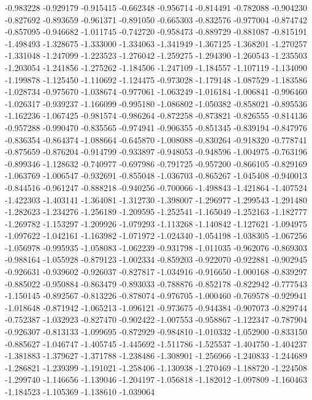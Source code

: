 -0.983228
-0.929179
-0.915415
-0.662348
-0.956714
-0.814491
-0.782088
-0.904230
-0.827692
-0.893659
-0.961371
-0.891050
-0.665303
-0.832576
-0.977004
-0.874742
-0.857095
-0.946682
-1.011745
-0.742720
-0.958473
-0.889729
-0.881087
-0.815191
-1.498493
-1.328675
-1.333000
-1.334063
-1.341949
-1.367125
-1.368201
-1.270257
-1.331048
-1.247099
-1.223523
-1.276042
-1.259275
-1.294390
-1.260543
-1.235503
-1.203054
-1.241856
-1.275262
-1.184506
-1.247109
-1.184557
-1.107119
-1.134090
-1.199878
-1.125450
-1.110692
-1.124475
-0.973028
-1.179148
-1.087529
-1.183586
-1.028734
-0.975670
-1.038674
-0.977061
-1.063249
-1.016184
-1.006841
-0.996460
-1.026317
-0.939237
-1.166099
-0.995180
-1.086802
-1.050382
-0.858021
-0.895536
-1.162236
-1.067425
-0.981574
-0.986264
-0.872258
-0.873821
-0.826555
-0.814136
-0.957288
-0.990470
-0.835565
-0.974941
-0.906355
-0.851345
-0.839194
-0.847976
-0.836354
-0.864374
-1.088664
-0.645870
-1.008088
-0.830264
-0.918320
-0.778741
-0.875659
-0.876204
-0.914799
-0.933897
-0.948053
-0.948596
-1.004975
-0.763196
-0.899346
-1.128632
-0.740977
-0.697986
-0.791725
-0.957200
-0.866105
-0.829169
-1.063769
-1.006547
-0.932691
-0.855048
-1.036703
-0.865267
-1.045408
-0.940013
-0.844516
-0.961247
-0.888218
-0.940256
-0.700066
-1.498843
-1.421864
-1.407524
-1.422303
-1.403141
-1.364081
-1.312730
-1.398007
-1.296977
-1.299543
-1.291480
-1.282623
-1.234276
-1.256189
-1.209595
-1.252541
-1.165049
-1.252163
-1.182777
-1.269782
-1.153297
-1.209926
-1.079293
-1.113268
-1.140842
-1.127621
-1.094975
-1.097622
-1.042161
-1.163982
-1.071972
-1.024340
-1.054198
-1.038305
-1.067256
-1.056978
-0.995935
-1.058083
-1.062239
-0.931798
-1.011035
-0.962076
-0.869303
-0.988164
-1.055928
-0.879123
-1.002334
-0.859203
-0.922070
-0.922881
-0.902945
-0.926631
-0.939602
-0.926037
-0.827817
-1.034916
-0.916650
-1.000168
-0.839297
-0.885022
-0.950884
-0.863479
-0.893033
-0.788876
-0.852178
-0.822942
-0.777543
-1.150145
-0.892567
-0.813226
-0.878074
-0.976705
-1.000460
-0.769578
-0.929941
-1.018648
-0.871942
-1.065213
-1.096121
-0.973675
-0.944384
-0.907073
-0.829744
-0.752387
-1.032923
-0.827470
-0.902422
-1.007553
-0.958867
-1.122347
-0.787904
-0.926307
-0.813133
-1.099695
-0.872929
-0.984810
-1.010332
-1.052900
-0.833150
-0.885627
-1.046747
-1.405745
-1.445692
-1.511786
-1.525537
-1.404750
-1.404237
-1.381883
-1.379627
-1.371788
-1.238486
-1.308901
-1.256966
-1.240833
-1.244689
-1.286821
-1.239399
-1.191021
-1.258406
-1.130938
-1.270469
-1.188720
-1.224508
-1.299740
-1.146656
-1.139046
-1.204197
-1.056818
-1.182012
-1.097809
-1.160463
-1.184523
-1.105369
-1.138610
-1.039064
